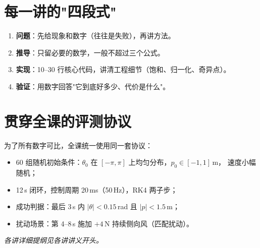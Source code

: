 \section*{每一讲的"四段式"}

\begin{enumerate}[leftmargin=2em,itemsep=2pt]
  \item \textbf{问题}：先给现象和数字（往往是失败），再讲方法。
  \item \textbf{推导}：只留必要的数学，一般不超过三个公式。
  \item \textbf{实现}：10--30 行核心代码，讲清工程细节（饱和、归一化、奇异点）。
  \item \textbf{验证}：用数字回答"它到底好多少、代价是什么"。
\end{enumerate}

\section*{贯穿全课的评测协议}

为了所有数字可比，全课统一使用同一套协议：

\begin{itemize}[leftmargin=2em,itemsep=2pt]
  \item 60 组随机初始条件：$\theta_0$ 在 $[-\pi,\pi]$ 上均匀分布，$p_0\in[-1,1]$\,m，
        速度小幅随机；
  \item 12\,s 闭环，控制周期 20\,ms（50\,Hz），RK4 两子步；
  \item 成功判据：最后 3\,s 内 $|\theta|<0.15$\,rad 且 $|p|<1.5$\,m；
  \item 扰动场景：第 4--8\,s 施加 $+4$\,N 持续侧向风（匹配扰动）。
\end{itemize}


\vspace{1em}
\noindent\textit{各讲详细提纲见各讲讲义开头。}
